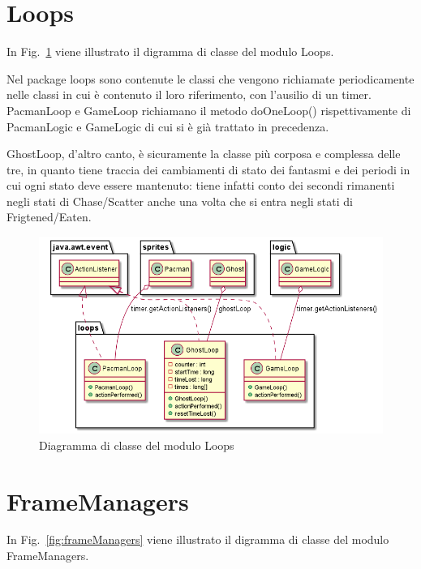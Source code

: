 \documentclass[12pt,a4paper]{report}
\begin{document}

\section{Loops}\label{se:arch.loops}
In Fig.~\ref{fig:loops} viene illustrato il digramma di classe del modulo Loops.\newline

Nel package loops sono contenute le classi che vengono richiamate periodicamente nelle classi in cui è contenuto il loro riferimento, con l’ausilio di un timer. PacmanLoop e GameLoop richiamano il metodo doOneLoop() rispettivamente di PacmanLogic e GameLogic di cui si è già trattato in precedenza.

GhostLoop, d’altro canto, è sicuramente la classe più corposa e complessa delle tre, in quanto tiene traccia dei cambiamenti di stato dei fantasmi e dei periodi in cui ogni stato deve essere mantenuto: tiene infatti conto dei secondi rimanenti negli stati di Chase/Scatter anche una volta che si entra negli stati di Frigtened/Eaten.

\begin{figure}[tb]
\begin{center}
  \includegraphics[width=15cm]{loops}
\end{center}
  \caption{Diagramma di classe del modulo Loops}
  \label{fig:loops}
\end{figure}


\section{FrameManagers}\label{se:arch.frameManagers}
In Fig.~\ref{fig:frameManagers} viene illustrato il digramma di classe del modulo FrameManagers.\newline
\end{document}
